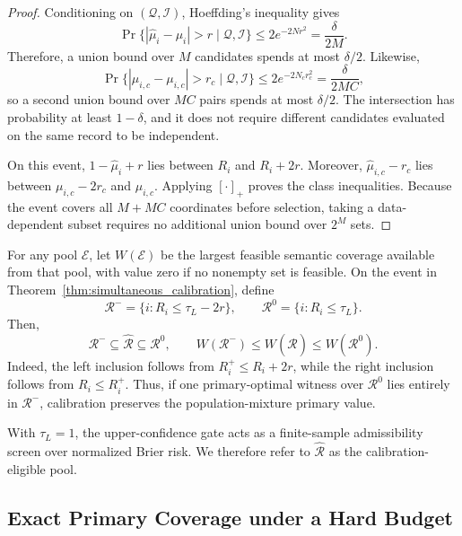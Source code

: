 \begin{proof}
Conditioning on $(\mathcal Q,\mathcal I)$, Hoeffding's inequality gives
\[
\Pr\{|\widehat\mu_i-\mu_i|>r\mid\mathcal Q,\mathcal I\}
\le2e^{-2Nr^2}=\frac{\delta}{2M}.
\]
Therefore, a union bound over $M$ candidates spends at most $\delta/2$.
Likewise,
\[
\Pr\{|\widehat\mu_{i,c}-\mu_{i,c}|>r_c\mid\mathcal Q,\mathcal I\}
\le2e^{-2N_cr_c^2}=\frac{\delta}{2MC},
\]
so a second union bound over $MC$ pairs spends at most $\delta/2$. The
intersection has probability at least $1-\delta$, and it does not require
different candidates evaluated on the same record to be independent.

On this event, $1-\widehat\mu_i+r$ lies between $R_i$ and $R_i+2r$.
Moreover, $\widehat\mu_{i,c}-r_c$ lies between $\mu_{i,c}-2r_c$ and
$\mu_{i,c}$. Applying $[\cdot]_+$ proves the class inequalities. Because
the event covers all $M+MC$ coordinates before selection, taking a
data-dependent subset requires no additional union bound over $2^M$ sets.
\end{proof}

For any pool $\mathcal E$, let $W(\mathcal E)$ be the largest feasible
semantic coverage available from that pool, with value zero if no nonempty
set is feasible. On the event in Theorem~\ref{thm:simultaneous_calibration},
define
\begin{equation}
\mathcal R^-=\{i:R_i\le\tau_L-2r\},
\qquad
\mathcal R^0=\{i:R_i\le\tau_L\}.
\end{equation}
Then,
\begin{equation}
\mathcal R^-\subseteq\widehat{\mathcal R}\subseteq\mathcal R^0,
\qquad
W(\mathcal R^-)\le W(\widehat{\mathcal R})\le W(\mathcal R^0).
\label{eq:coverage_sandwich}
\end{equation}
Indeed, the left inclusion follows from $R_i^+\le R_i+2r$, while the right
inclusion follows from $R_i\le R_i^+$. Thus, if one primary-optimal witness
over $\mathcal R^0$ lies entirely in $\mathcal R^-$, calibration preserves
the population-mixture primary value.

With $\tau_L=1$, the upper-confidence gate acts as a
finite-sample admissibility screen over normalized Brier risk. We therefore
refer to $\widehat{\mathcal R}$ as the calibration-eligible pool.

\subsection{Exact Primary Coverage under a Hard Budget}

